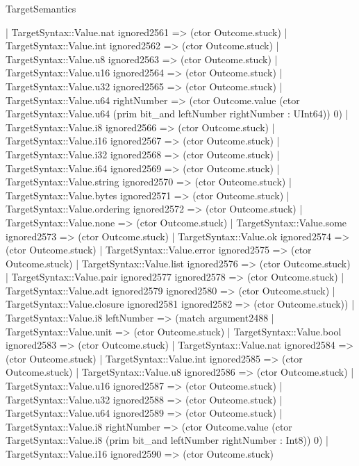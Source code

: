 \begin{lexlean}{TargetSemantics}
\begin{semanticmodule}
{              | TargetSyntax::Value.nat ignored2561 => (ctor Outcome.stuck)
              | TargetSyntax::Value.int ignored2562 => (ctor Outcome.stuck)
              | TargetSyntax::Value.u8 ignored2563 => (ctor Outcome.stuck)
              | TargetSyntax::Value.u16 ignored2564 => (ctor Outcome.stuck)
              | TargetSyntax::Value.u32 ignored2565 => (ctor Outcome.stuck)
              | TargetSyntax::Value.u64 rightNumber => (ctor Outcome.value (ctor TargetSyntax::Value.u64 (prim bit_and leftNumber rightNumber : UInt64)) 0)
              | TargetSyntax::Value.i8 ignored2566 => (ctor Outcome.stuck)
              | TargetSyntax::Value.i16 ignored2567 => (ctor Outcome.stuck)
              | TargetSyntax::Value.i32 ignored2568 => (ctor Outcome.stuck)
              | TargetSyntax::Value.i64 ignored2569 => (ctor Outcome.stuck)
              | TargetSyntax::Value.string ignored2570 => (ctor Outcome.stuck)
              | TargetSyntax::Value.bytes ignored2571 => (ctor Outcome.stuck)
              | TargetSyntax::Value.ordering ignored2572 => (ctor Outcome.stuck)
              | TargetSyntax::Value.none => (ctor Outcome.stuck)
              | TargetSyntax::Value.some ignored2573 => (ctor Outcome.stuck)
              | TargetSyntax::Value.ok ignored2574 => (ctor Outcome.stuck)
              | TargetSyntax::Value.error ignored2575 => (ctor Outcome.stuck)
              | TargetSyntax::Value.list ignored2576 => (ctor Outcome.stuck)
              | TargetSyntax::Value.pair ignored2577 ignored2578 => (ctor Outcome.stuck)
              | TargetSyntax::Value.adt ignored2579 ignored2580 => (ctor Outcome.stuck)
              | TargetSyntax::Value.closure ignored2581 ignored2582 => (ctor Outcome.stuck))
            | TargetSyntax::Value.i8 leftNumber => (match argument2488
              | TargetSyntax::Value.unit => (ctor Outcome.stuck)
              | TargetSyntax::Value.bool ignored2583 => (ctor Outcome.stuck)
              | TargetSyntax::Value.nat ignored2584 => (ctor Outcome.stuck)
              | TargetSyntax::Value.int ignored2585 => (ctor Outcome.stuck)
              | TargetSyntax::Value.u8 ignored2586 => (ctor Outcome.stuck)
              | TargetSyntax::Value.u16 ignored2587 => (ctor Outcome.stuck)
              | TargetSyntax::Value.u32 ignored2588 => (ctor Outcome.stuck)
              | TargetSyntax::Value.u64 ignored2589 => (ctor Outcome.stuck)
              | TargetSyntax::Value.i8 rightNumber => (ctor Outcome.value (ctor TargetSyntax::Value.i8 (prim bit_and leftNumber rightNumber : Int8)) 0)
              | TargetSyntax::Value.i16 ignored2590 => (ctor Outcome.stuck)
}
\end{semanticmodule}
\end{lexlean}
